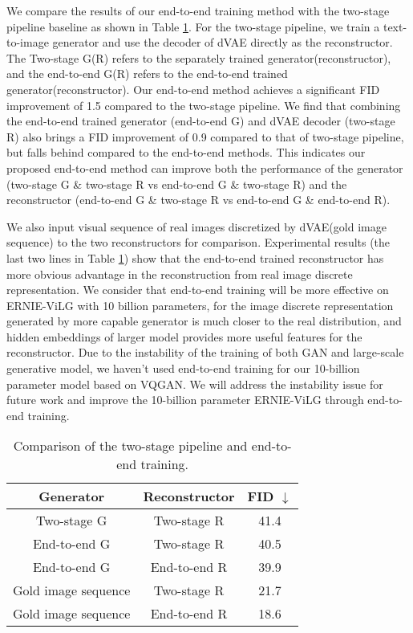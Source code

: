 \documentclass{article}
\begin{document}
We compare the results of our end-to-end training method with the two-stage pipeline baseline as shown in Table \ref{tab:end2end-gen-result}. For the two-stage pipeline, we train a text-to-image generator and use the decoder of dVAE directly as the reconstructor. The Two-stage G(R) refers to the separately trained generator(reconstructor), and the end-to-end G(R) refers to the end-to-end trained generator(reconstructor). Our end-to-end method achieves a significant FID improvement of 1.5 compared to the two-stage pipeline. 
We find that combining the end-to-end trained generator (end-to-end G) and dVAE decoder (two-stage R) also brings a FID improvement of 0.9 compared to that of two-stage pipeline, but falls behind compared to the end-to-end methods. This indicates our proposed end-to-end method can improve both the performance of the generator (two-stage G \& two-stage R vs end-to-end G \& two-stage R) and the reconstructor (end-to-end G \& two-stage R vs end-to-end G \& end-to-end R).  

We also input visual sequence of real images discretized by dVAE(gold image sequence) to the two reconstructors for comparison. Experimental results (the last two lines in Table \ref{tab:end2end-gen-result}) show that the end-to-end trained reconstructor has more obvious advantage in the reconstruction from real image discrete representation. We consider that end-to-end training will be more effective on ERNIE-ViLG with 10 billion parameters, for the image discrete representation generated by more capable generator is much closer to the real distribution, and hidden embeddings of larger model provides more useful features for the reconstructor. Due to the instability of the training of both GAN and large-scale generative model, we haven't used end-to-end training for our 10-billion parameter model based on VQGAN. We will address the instability issue for future work and improve the 10-billion parameter ERNIE-ViLG through end-to-end training.

\begin{table}[htb]
  \caption{Comparison of the two-stage pipeline and end-to-end training.}
  \begin{tabular}{c|c|c}
    \toprule
    Generator & Reconstructor  & FID $\downarrow$ \\
    \midrule
    Two-stage G & Two-stage R & 41.4 \\
    End-to-end G & Two-stage R &  40.5 \\
    End-to-end G & End-to-end R & 39.9 \\
    Gold image sequence & Two-stage R & 21.7 \\
    Gold image sequence & End-to-end R & 18.6 \\
    \bottomrule
  \end{tabular}
  \label{tab:end2end-gen-result}
  \centering
\end{table}
\end{document}
